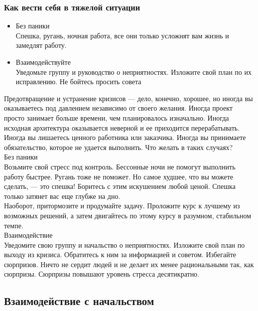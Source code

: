 \documentclass{../industrial-development}
\begin{document}
\begin{frame} \frametitle{Как вести себя в тяжелой ситуации}
\begin{itemize}
  \item Без паники\\
	Спешка, ругань, ночная работа, все они только усложнят вам жизнь и замедлят работу.
  \item Взаимодействуйте\\
	Уведомьте группу и руководство о неприятностях. Изложите свой план по их исправлению. Не бойтесь просить совета
\end{itemize}
\end{frame}
\lecturenotes
Предотвращение и устранение кризисов — дело, конечно, хорошее, но иногда вы оказываетесь под давлением независимо от своего желания. Иногда проект просто занимает больше времени, чем планировалось изначально. Иногда исходная архитектура оказывается неверной и ее приходится перерабатывать. Иногда вы лишаетесь ценного работника или заказчика. Иногда вы принимаете обязательство, которое не удается выполнить. Что желать в таких случаях?\\
Без паники\\
Возьмите свой стресс под контроль. Бессонные ночи не помогут выполнить работу быстрее. Ругань тоже не поможет. Но самое худшее, что вы можете сделать, — это спешка! Боритесь с этим искушением любой ценой. Спешка только затянет вас еще глубже на дно.\\
Наоборот, притормозите и продумайте задачу. Проложите курс к лучшему из возможных решений, а затем двигайтесь по этому курсу в разумном, стабильном темпе.\\
Взаимодействие\\
Уведомите свою группу и начальство о неприятностях. Изложите свой план по выходу из кризиса. Обратитесь к ним за информацией и советом. Избегайте сюрпризов. Ничто не сердит людей и не делает их менее рациональными так, как сюрпризы. Сюрпризы повышают уровень стресса десятикратно.

\subsection{Взаимодействие с начальством}
\end{document}
